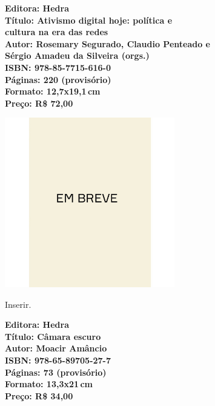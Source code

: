 \vfill
\noindent\begin{minipage}[c]{1\linewidth}
{\small\textbf{
\hspace*{-.1cm}Editora: Hedra\\
Título: Ativismo digital hoje: política e\\cultura na era das redes\\
Autor: Rosemary Segurado, Claudio Penteado e\\Sérgio Amadeu da Silveira (orgs.)\\ 
ISBN: 978-85-7715-616-0\\
Páginas: 220 (provisório)\\
Formato: 12,7x19,1\,cm\\
Preço: R\$ 72,00\\
}}
\end{minipage}
\pagebreak

\begin{center}
\hspace*{.5cm}\includegraphics[width=74mm]{./CAPAS/breve.jpeg}
\end{center}
\hspace*{-7cm}\hrulefill\hspace*{-7cm}
\medskip

\noindent{}Inserir.

\vfill
\noindent\begin{minipage}[c]{1\linewidth}
{\small\textbf{
\hspace*{-.1cm}Editora: Hedra\\
Título: Câmara escuro\\
Autor: Moacir Amâncio\\ 
ISBN: 978-65-89705-27-7\\
Páginas: 73 (provisório)\\
Formato: 13,3x21\,cm\\
Preço: R\$ 34,00\\
}}
\end{minipage}
\pagebreak

